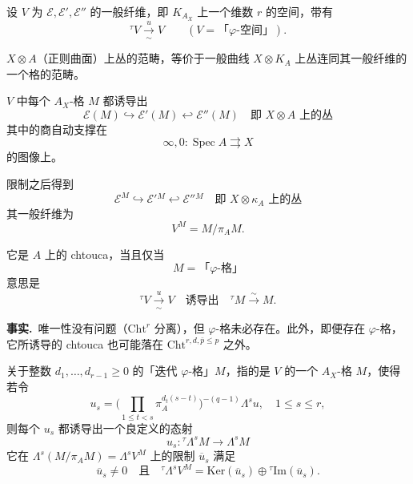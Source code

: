 设 $V$ 为 $\mathcal{E},\mathcal{E}',\mathcal{E}''$ 的一般纤维，即 $K_{A_{X}}$ 上一个维数 $r$ 的空间，带有
\[
{}^{\tau}V\xrightarrow[\sim]{u}V\qquad(V=\text{「}\varphi\text{-空间」}).
\]

\begin{lemma*}
$X\otimes A$（正则曲面）上丛的范畴，等价于一般曲线 $X\otimes K_{A}$ 上丛连同其一般纤维的一个格的范畴。
\end{lemma*}

$V$ 中每个 $A_{X}$-格 $M$ 都诱导出
\[
\mathcal{E}(M)\hookrightarrow\mathcal{E}'(M)\hookleftarrow\mathcal{E}''(M)\quad\text{即 }X\otimes A\text{ 上的丛}
\]
其中的商自动支撑在
\[
\infty,0:\operatorname{Spec}A\rightrightarrows X
\]
的图像上。

限制之后得到
\[
\mathcal{E}^{M}\hookrightarrow\mathcal{E}'{}^{M}\hookleftarrow\mathcal{E}''{}^{M}\quad\text{即 }X\otimes\kappa_{A}\text{ 上的丛}
\]
其一般纤维为
\[
V^{M}=M/\pi_{A}M.
\]

它是 $A$ 上的 chtouca，当且仅当
\[
M=\text{「}\varphi\text{-格」}
\]
意思是
\[
{}^{\tau}V\xrightarrow[\sim]{u}V\quad\text{诱导出}\quad{}^{\tau}M\xrightarrow{\sim}M.
\]

\par\medskip\noindent\textbf{事实.}\ 唯一性没有问题（$\mathrm{Cht}^{r}$ 分离），但 $\varphi$-格未必存在。此外，即便存在 $\varphi$-格，它所诱导的 chtouca 也可能落在 $\mathrm{Cht}^{r,d,\bar{p}\le p}$ 之外。

\begin{definition*}
关于整数 $d_{1},\ldots,d_{r-1}\ge 0$ 的「迭代 $\varphi$-格」$M$，指的是 $V$ 的一个 $A_{X}$-格 $M$，使得若令
\[
u_{s}=\Big(\prod_{1\le t<s}\pi_{A}^{d_{t}(s-t)}\Big)^{-(q-1)}\Lambda^{s}u,\quad 1\le s\le r,
\]
则每个 $u_{s}$ 都诱导出一个良定义的态射
\[
u_{s}:{}^{\tau}\Lambda^{s}M\to\Lambda^{s}M
\]
它在 $\Lambda^{s}(M/\pi_{A}M)=\Lambda^{s}V^{M}$ 上的限制 $\overline{u}_{s}$ 满足
\[
\overline{u}_{s}\ne 0\quad\text{且}\quad{}^{\tau}\Lambda^{s}V^{M}=\mathrm{Ker}(\overline{u}_{s})\oplus{}^{\tau}\mathrm{Im}(\overline{u}_{s}).
\]
\end{definition*}

%
